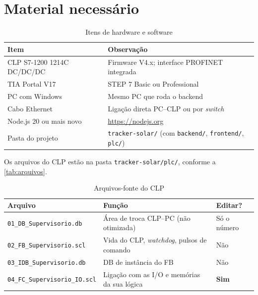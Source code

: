 \documentclass[12pt, oneside, a4paper, chapter=TITLE, section=TITLE, english, brazil]{abntex2}
\begin{document}
\chapter{Material necessário}

\begin{table}[htbp]
\centering
\caption{Itens de hardware e software}
\label{tab:material}
\begin{tabular}{p{}p{}}
\toprule
\textbf{Item} & \textbf{Observação} \\
\midrule
CLP S7-1200 1214C DC/DC/DC & Firmware V4.x; interface PROFINET integrada \\
TIA Portal V17 & STEP 7 Basic ou Professional \\
PC com Windows & Mesmo PC que roda o backend \\
Cabo Ethernet & Ligação direta PC--CLP ou por \emph{switch} \\
Node.js 20 ou mais novo & \url{https://nodejs.org} \\
Pasta do projeto & \texttt{tracker-solar/} (com \texttt{backend/}, \texttt{frontend/}, \texttt{plc/}) \\
\bottomrule
\end{tabular}
\end{table}

Os arquivos do CLP estão na pasta \texttt{tracker-solar/plc/}, conforme a \autoref{tab:arquivos}.

\begin{table}[htbp]
\centering
\caption{Arquivos-fonte do CLP}
\label{tab:arquivos}
\begin{tabular}{p{}p{}p{}}
\toprule
\textbf{Arquivo} & \textbf{Função} & \textbf{Editar?} \\
\midrule
\texttt{01\_DB\_Supervisorio.db} & Área de troca CLP--PC (não otimizada) & Só o número \\
\texttt{02\_FB\_Supervisorio.scl} & Vida do CLP, \emph{watchdog}, pulsos de comando & Não \\
\texttt{03\_IDB\_Supervisorio.db} & DB de instância do FB & Não \\
\texttt{04\_FC\_Supervisorio\_IO.scl} & Ligação com as I/O e memórias da sua lógica & \textbf{Sim} \\
\bottomrule
\end{tabular}
\end{table}
\end{document}
